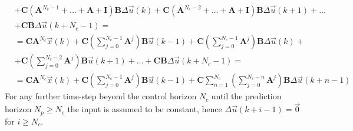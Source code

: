 \documentclass[12pt,a4paper,oneside]{book}
\begin{document}
\begin{onehalfspace}
\begin{equation}
\begin{aligned}
		&+\mathbf{C}\left( 
		\mathbf{A}^{N_c-1}+...+\mathbf{A}+\mathbf{I}\right)\mathbf{B}\Delta\vec{u}(k)+
		 \mathbf{C}\left( 
		\mathbf{A}^{N_c-2}+...+\mathbf{A}+\mathbf{I}\right)\mathbf{B}\Delta\vec{u}(k+1)+...\\[6pt]
		&+\mathbf{C}\mathbf{B}\Delta\vec{u}(k+N_c-1) = \\[6pt]
		&=\mathbf{C}\mathbf{A}^{N_c}\vec{x}(k)+\mathbf{C}\left(\sum_{j=0}^{N_c-1}\mathbf{A}^j\right)
		\mathbf{B}\vec{u}(k-1)+\mathbf{C}\left(\sum_{j=0}^{N_c-1}\mathbf{A}^j\right)
		 \mathbf{B}\Delta\vec{u}(k)+\\[6pt]
		&+\mathbf{C}\left(\sum_{j=0}^{N_c-2}\mathbf{A}^j\right) 
		\mathbf{B}\vec{u}(k+1)+...+\mathbf{C}\mathbf{B}\Delta\vec{u}(k+N_c-1) = 
		\\[6pt]
		&=\mathbf{C}\mathbf{A}^{N_c}\vec{x}(k)+\mathbf{C}\left(\sum_{j=0}^{N_c-1}
		 \mathbf{A}^j\right)\mathbf{B}\vec{u}(k-1)+\mathbf{C}\sum_{n=1}^{N_c} 
		\left(\sum_{j=0}^{N_c-n}\mathbf{A}^j\right)\mathbf{B}\Delta\vec{u}(k+n-1)
	\end{aligned}
\end{equation}
For any further time-step beyond the control horizon $N_c$ until the prediction 
horizon $N_p\ge N_c$ the input is assumed to be constant, hence 
$\Delta\vec{u}(k+i-1)=\vec{0}$ for $i\ge N_c$.\\


\end{onehalfspace}
\end{document}
